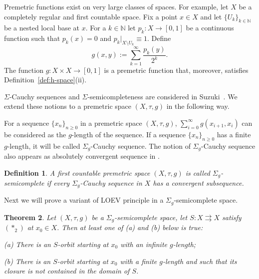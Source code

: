 \documentclass[12pt]{article}
\newtheorem{theorem}{Theorem}[section]
\newtheorem{definition}[theorem]{Definition}
\def\ds{\displaystyle}
\newcommand{\astwo}{(\ast_2)}
\newcommand{\N}{\mathbb{N}}
\begin{document}
Premetric functions exist on very large classes of spaces. For example,
let $X$ be a completely regular and first countable space. Fix a point $x \in X$ and let  $\{U_k\}_{k\in\mathbb{N}}$ be a  nested local base at $x$. For a $k\in \N$ let $p_k: X \rightarrow [0, 1]$ be a continuous function such that $p_k(x)=0$ and $p_k|_{X \setminus U_k} \equiv 1$. Define
\begin{equation}
    \label{eq:g-def}
    g(x,y):=\sum_{k=1}^{\infty}\frac{p_k(y)}{2^k}.
\end{equation}
The function $g: X \times X \rightarrow [0,1]$ is a premetric function that, moreover, satisfies  Definition~\ref{def:h-space}(ii).


$\Sigma$-Cauchy sequences and $\Sigma$-semicompleteness are considered in Suzuki~\cite{Suzuki-2018}. We extend these notions  to a premetric space $(X,\tau,g)$ in the following way.


For a sequence $\{x_n\}_{n\ge 0} $ in a premetric space $(X,\tau,g)$,  $\ds  \sum_{i=0}^{\infty} g(x_{i+1},x_i)$ can be considered as the $g$-length of the sequence. If a sequence $\{x_n\}_{n\ge 0} $ has a finite $g$-length, it will be called  $\Sigma_g$-Cauchy sequence. The notion of $\Sigma_g$-Cauchy sequence also appears as absolutely convergent sequence in \cite{MacNeille}.

\begin{definition} \label{completeness}
A first countable premetric space $(X,\tau,g)$ is called  $\Sigma_g$-semicomplete if every $\Sigma_g$-Cauchy sequence in $X$ has a convergent subsequence.
\end{definition}

Next we will prove a variant of LOEV principle in a  $\Sigma_g$-semicomplete space.

\begin{theorem}\label{LOEV}
Let $(X,\tau,g)$ be a $\Sigma_g$-semicomplete space, let $S:X \rightrightarrows X$ satisfy $\astwo$ at $x_0 \in X$. Then at least one of (a) and (b) below is true:

(a) There is an $S$-orbit starting at $x_0$ with an infinite $g$-length;

(b) There is an $S$-orbit starting at $x_0$ with a finite $g$-length and such that its closure is not contained in the domain of $S$.
\end{theorem}
\end{document}
